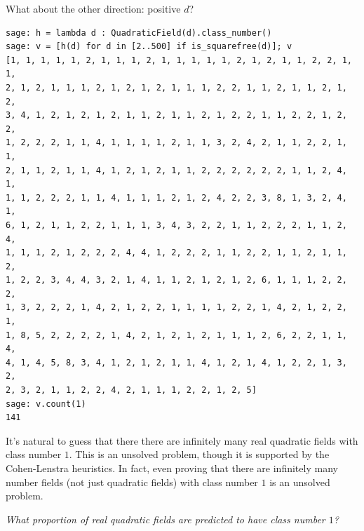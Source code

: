 \documentclass{book}
\theoremstyle{plain}
\theoremstyle{definition}
\numberwithin{equation}{section}
\numberwithin{figure}{section}
\numberwithin{table}{section}
\newcommand{\hw}[2]{\par\vspace{1em}{\bf HW (#1):} {\em #2}\par\vspace{1em}}
\begin{document}
What about the other direction: positive $d$?
\begin{lstlisting}
sage: h = lambda d : QuadraticField(d).class_number()
sage: v = [h(d) for d in [2..500] if is_squarefree(d)]; v
[1, 1, 1, 1, 1, 2, 1, 1, 1, 2, 1, 1, 1, 1, 1, 2, 1, 2, 1, 1, 2, 2, 1, 1,
2, 1, 2, 1, 1, 1, 2, 1, 2, 1, 2, 1, 1, 1, 2, 2, 1, 1, 2, 1, 1, 2, 1, 2,
3, 4, 1, 2, 1, 2, 1, 2, 1, 1, 2, 1, 1, 2, 1, 2, 2, 1, 1, 2, 2, 1, 2, 2,
1, 2, 2, 2, 1, 1, 4, 1, 1, 1, 1, 2, 1, 1, 3, 2, 4, 2, 1, 1, 2, 2, 1, 1,
2, 1, 1, 2, 1, 1, 4, 1, 2, 1, 2, 1, 1, 2, 2, 2, 2, 2, 2, 1, 1, 2, 4, 1,
1, 1, 2, 2, 2, 1, 1, 4, 1, 1, 1, 2, 1, 2, 4, 2, 2, 3, 8, 1, 3, 2, 4, 1,
6, 1, 2, 1, 1, 2, 2, 1, 1, 1, 3, 4, 3, 2, 2, 1, 1, 2, 2, 2, 1, 1, 2, 4,
1, 1, 1, 2, 1, 2, 2, 2, 4, 4, 1, 2, 2, 2, 1, 1, 2, 2, 1, 1, 2, 1, 1, 2,
1, 2, 2, 3, 4, 4, 3, 2, 1, 4, 1, 1, 2, 1, 2, 1, 2, 6, 1, 1, 1, 2, 2, 2,
1, 3, 2, 2, 2, 1, 4, 2, 1, 2, 2, 1, 1, 1, 1, 2, 2, 1, 4, 2, 1, 2, 2, 1,
1, 8, 5, 2, 2, 2, 2, 1, 4, 2, 1, 2, 1, 2, 1, 1, 1, 2, 6, 2, 2, 1, 1, 4,
4, 1, 4, 5, 8, 3, 4, 1, 2, 1, 2, 1, 1, 4, 1, 2, 1, 4, 1, 2, 2, 1, 3, 2,
2, 3, 2, 1, 1, 2, 2, 4, 2, 1, 1, 1, 2, 2, 1, 2, 5]
sage: v.count(1)
141
\end{lstlisting}
It's natural to guess that there there are infinitely many
real quadratic fields with class number $1$.
This is an unsolved problem, though it is supported
by the Cohen-Lenstra heuristics.   In fact, even proving
that there are infinitely many number fields (not just quadratic
fields) with class number $1$ is an unsolved problem.

\hw{Volunteer}{What proportion of real quadratic fields are
predicted to have class number $1$?}
\end{document}
